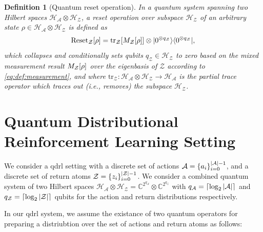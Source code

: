 \documentclass{article}
\newtheorem{definition}{Definition}[section]
\DeclarePairedDelimiter{\bra}{\langle}{\rvert} %
\DeclarePairedDelimiter{\ket}{\lvert}{\rangle} %
\DeclarePairedDelimiter{\abs}{\lvert}{\rvert} %
\DeclarePairedDelimiter{\bparen}{[}{]} %
\DeclarePairedDelimiter{\set}{\{}{\}} %
\DeclarePairedDelimiter{\ceil}{\lceil}{\rceil}
\newcommand{\E}{\mathbb{E}} %
\newcommand{\hilbert}{\mathcal{H}} %
\newcommand{\bfunc}[2]{#1\bparen*{#2}} %
\begin{document}
\begin{definition}[Quantum reset operation]
In a quantum system spanning two Hilbert spaces $\hilbert_{\mathcal{A}} \otimes \hilbert_{\mathcal{Z}}$, a reset operation over subspace $\hilbert_{\mathcal{Z}}$ of an arbitrary state $\rho \in \hilbert_{\mathcal{A}} \otimes \hilbert_{\mathcal{Z}}$ is defined as
% 
\begin{equation}\label{eq:def:reset}
\bfunc{\textrm{Reset}_{\mathcal{Z}}}{\rho}
= \bfunc{\textrm{tr}_{\mathcal{Z}}}{\bfunc{M_{\mathcal{Z}}}{\rho}} \otimes \ket{0^{\otimes q_{\mathcal{Z}}}}\bra{0^{\otimes q_{\mathcal{Z}}}},
\end{equation}
% 
which collapses and conditionally sets qubits $q_{\mathcal{Z}} \in \hilbert_{\mathcal{Z}}$ to zero based on the mixed measurement result $\bfunc{M_{\mathcal{Z}}}{\rho}$ over the eigenbasis of $\mathcal{Z}$ according to \cref{eq:def:measurement}, and where $\textrm{tr}_{\mathcal{Z}} : \hilbert_{\mathcal{A}} \otimes \hilbert_{\mathcal{Z}} \to \hilbert_{\mathcal{A}}$ is the partial trace operator which traces out (i.e., removes) the subspace $\hilbert_{\mathcal{Z}}$.
\end{definition}




\section{Quantum Distributional Reinforcement Learning Setting}

We consider a \ac{qdrl} setting with a discrete set of actions $\mathcal{A} = \set{a_i}_{i=0}^{\abs{\mathcal{A}} - 1}$, and a discrete set of return atoms $\mathcal{Z} = \set{z_i}_{i=0}^{\abs{\mathcal{Z}} - 1}$.
% 
We consider a combined quantum system of two Hilbert spaces $\hilbert_{\mathcal{A}} \otimes \hilbert_{\mathcal{Z}} = \mathbb{C}^{2^{q_{\mathcal{A}}}} \otimes \mathbb{C}^{2^{q_{\mathcal{Z}}}}$ with $q_{\mathcal{A}} = \ceil*{\log_{2}{\abs{\mathcal{A}}}}$ and $q_{\mathcal{Z}} = \ceil*{\log_{2}{\abs{\mathcal{Z}}}}$ qubits for the action and return distributions respectively.

In our \ac{qdrl} system, we assume the existance of two quantum operators for preparing a distriubtion over the set of actions and return atoms as follows:
\end{document}
